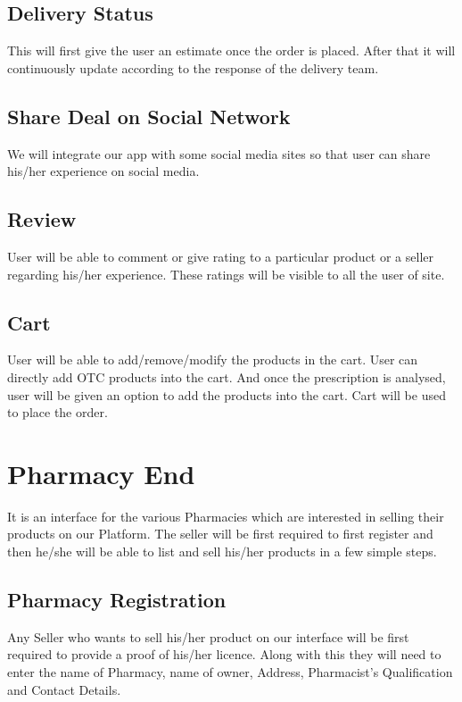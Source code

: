 \documentclass[fleqn,10pt]{../SelfArx} %
\begin{document}
\subsection{Delivery Status}
This will first give the user an estimate once the order is placed. After that it will continuously update according to the response of the delivery team.

\subsection{Share Deal on Social Network}
We will integrate our app with some social media sites so that user can share his/her experience on social media.
\subsection{Review}
User will be able to comment or give rating to a particular product or a seller regarding his/her experience. These ratings will be visible to all the user of site.
\subsection{Cart}
User will be able to add/remove/modify the products in the cart. User can directly add OTC products into the cart. And once the prescription is analysed, user will be given an option to add the products into the cart. Cart will be used to place the order.

\section{Pharmacy End}

It is an interface for the various Pharmacies which are interested in selling their products on our Platform. The seller will be first required to first register and then he/she will be able to list and sell his/her products in a few simple steps.
\subsection{Pharmacy Registration}

Any Seller who wants to sell his/her product on our interface will be first required to provide a proof of his/her licence. Along with this they will need to enter the name of Pharmacy, name of owner, Address, Pharmacist’s Qualification and Contact Details. 
\end{document}
